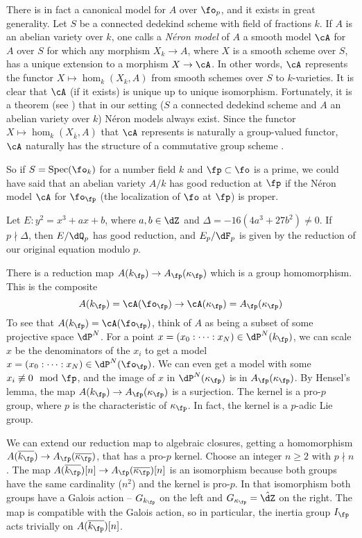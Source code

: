 There is in fact a canonical model for $A$ over $\fo_p$, and it exists in great 
generality. Let $S$ be a connected dedekind scheme with field of fractions $k$. 
If $A$ is an abelian variety over $k$, one calls a \emph{N\'eron model} of $A$ 
a smooth model $\cA$ for $A$ over $S$ for which any morphism $X_k\to A$, where 
$X$ is a smooth scheme over $S$, has a unique extension to a morphism 
$X\to \cA$. In other words, $\cA$ represents the functor 
$X\mapsto \hom_k(X_k,A)$ from smooth schemes over $S$ to $k$-varieties. It is 
clear that $\cA$ (if it exists) is unique up to unique isomorphism. 
Fortunately, it is a theorem (see \cite[1.4.1]{blr90}) that in our setting 
($S$ a connected dedekind scheme and $A$ an abelian variety over $k$) N\'eron 
models always exist. Since the functor $X\mapsto \hom_k(X_{\bar k},A)$ that 
$\cA$ represents is naturally a group-valued functor, $\cA$ naturally has the 
structure of a commutative group scheme \cite[1.2.6]{blr90}. 

So if $S=\spec(\fo_k)$ for a number field $k$ and $\fp\subset \fo$ is a prime, 
we could have said that an abelian variety $A/k$ has good reduction at $\fp$ 
if the N\'eron model $\cA$ for $\fo_\fp$ (the localization of $\fo$ at 
$\fp$) is proper. 

\begin{example}
Let $E:y^2=x^3+a x+b$, where $a,b\in \dZ$ and $\Delta=-16(4 a^3+27b^2)\ne 0$. 
If $p\nmid \Delta$, then $E/\dQ_p$ has good reduction, and $E_p/\dF_p$ is given 
by the reduction of our original equation modulo $p$. 
\end{example}

There is a reduction map $A(k_\fp)\to A_\fp(\kappa_\fp)$ which is a group 
homomorphism. This is the composite 
\[
  A(k_\fp)=\cA(\fo_\fp) \to \cA(\kappa_\fp) = A_\fp(\kappa_\fp)
\]
To see that $A(k_\fp)=\cA(\fo_\fp)$, think of $A$ as being a subset of some 
projective space $\dP^N$. For a point
$x=(x_0:\cdots:x_N)\in \dP^N(k_\fp)$, we can scale $x$ be the 
denominators of the $x_i$ to get a model 
$x=(x_0:\cdots:x_N)\in\dP^N(\fo_\fp)$. We can even get a model with 
some $x_i\not\equiv 0\mod\fp$, and the image of $x$ in 
$\dP^N(\kappa_\fp)$ is in $A_\fp(\kappa_\fp)$. By Hensel's lemma, the 
map $A(k_\fp) \to A_\fp(\kappa_\fp)$ is a surjection. The kernel is a pro-$p$ 
group, where $p$ is the characteristic of $\kappa_\fp$. In fact, the kernel is 
a $p$-adic Lie group. 

We can extend our reduction map to algebraic closures, getting a homomorphism 
$A(\overline{k_\fp}) \to A_\fp(\overline{\kappa_\fp})$, that has a pro-$p$ 
kernel. Choose an integer $n\geqslant 2$ with $p\nmid n$. The map 
$A(\overline{k_\fp})[n] \to A_\fp(\overline{\kappa_\fp})[n]$ is an isomorphism 
because both groups have the same cardinality ($n^2$) and the kernel is 
pro-$p$. In that isomorphism both groups have a Galois action -- $G_{k_\fp}$ on 
the left and $G_{\kappa_\fp}=\hat\dZ$ on the right. The map is compatible with 
the Galois action, so in particular, the inertia group $I_\fp$ acts trivially 
on $A(\overline{k_\fp})[n]$. 

